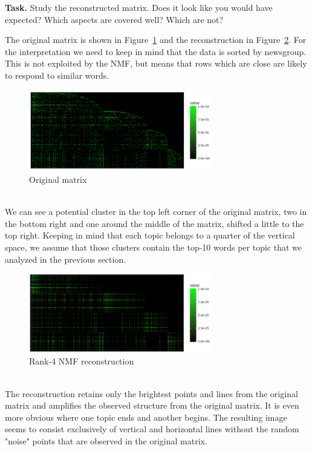 \documentclass{support/acm_proc_article-sp}
\begin{document}
    \textbf{Task.} Study the reconstructed matrix.
    Does it look like you would have expected?
    Which aspects are covered well?
    Which are not?

    The original matrix is shown in Figure~\ref{fig:1b-original} and the reconstruction in Figure~\ref{fig:1b-reconstruction}.
    For the interpretation we need to keep in mind that the data is sorted by newsgroup.
    This is not exploited by the NMF, but means that rows which are close are likely to respond to similar words.
    \begin{figure}[htbp]
        \centering
        \includegraphics[width=8cm]{images/1b-original.png}
        \caption{Original matrix}
        \label{fig:1b-original}
    \end{figure} \\
    We can see a potential cluster in the top left corner of the original matrix, two in the bottom right and one
    around the middle of the matrix, shifted a little to the top right.
    Keeping in mind that each topic belongs to a quarter of the vertical space, we assume that those clusters contain
    the top-10 words per topic that we analyzed in the previous section.
    \begin{figure}[htbp]
        \centering
        \includegraphics[width=8cm]{images/1b-reconstruction.png}
        \caption{Rank-4 NMF reconstruction}
        \label{fig:1b-reconstruction}
    \end{figure} \\
    The reconstruction retains only the brightest points and lines from the original matrix and amplifies the
    observed structure from the original matrix.
    It is even more obvious where one topic ends and another begins.
    The resulting image seems to consist exclusively of vertical and horizontal lines without the random "noise" points
    that are observed in the original matrix.
\end{document}
